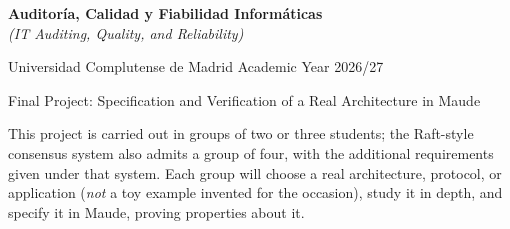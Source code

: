 

\usepackage{url}
\usepackage{hyperref}



\begin{center}
{\Large\textbf{Auditor\'ia, Calidad y Fiabilidad Inform\'aticas}}\\[2pt]
\textit{(IT Auditing, Quality, and Reliability)}
\smallskip

\large
Universidad Complutense de Madrid \qquad Academic Year 2026/27
\medskip

Final Project: Specification and Verification of a Real Architecture in Maude\hfill\mbox{}

\noindent\hrulefill
\end{center}

\noindent
This project is carried out in groups of two or three students; the
Raft-style consensus system also admits a group of four, with the additional
requirements given under that system.
%
Each group will choose a real architecture, protocol, or application
(\emph{not} a toy example invented for the occasion), study it in depth, and
specify it in Maude, proving properties about it.

